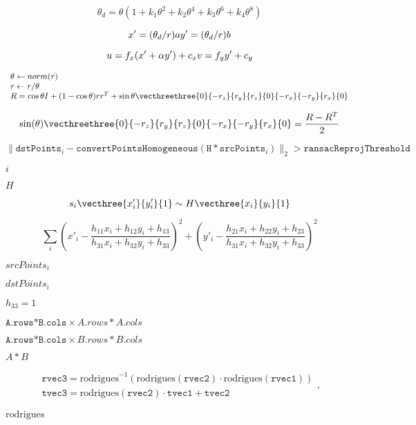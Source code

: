 \documentclass{article}
\begin{document}
\[\theta_d = \theta (1 + k_1 \theta^2 + k_2 \theta^4 + k_3 \theta^6 + k_4 \theta^8)\]
\pagebreak

\[x' = (\theta_d / r) a \\ y' = (\theta_d / r) b \]
\pagebreak

\[u = f_x (x' + \alpha y') + c_x \\ v = f_y y' + c_y\]
\pagebreak

\[\begin{array}{l} \theta \leftarrow norm(r) \\ r \leftarrow r/ \theta \\ R = \cos{\theta} I + (1- \cos{\theta} ) r r^T + \sin{\theta} \vecthreethree{0}{-r_z}{r_y}{r_z}{0}{-r_x}{-r_y}{r_x}{0} \end{array}\]
\pagebreak

\[\sin ( \theta ) \vecthreethree{0}{-r_z}{r_y}{r_z}{0}{-r_x}{-r_y}{r_x}{0} = \frac{R - R^T}{2}\]
\pagebreak

\[\| \texttt{dstPoints} _i - \texttt{convertPointsHomogeneous} ( \texttt{H} * \texttt{srcPoints} _i) \|_2 > \texttt{ransacReprojThreshold}\]
\pagebreak

$i$
\pagebreak

$H$
\pagebreak

\[s_i \vecthree{x'_i}{y'_i}{1} \sim H \vecthree{x_i}{y_i}{1}\]
\pagebreak

\[\sum _i \left ( x'_i- \frac{h_{11} x_i + h_{12} y_i + h_{13}}{h_{31} x_i + h_{32} y_i + h_{33}} \right )^2+ \left ( y'_i- \frac{h_{21} x_i + h_{22} y_i + h_{23}}{h_{31} x_i + h_{32} y_i + h_{33}} \right )^2\]
\pagebreak

$srcPoints_i$
\pagebreak

$dstPoints_i$
\pagebreak

$h_{33}=1$
\pagebreak

$\texttt{A.rows*B.cols} \times {A.rows*A.cols}$
\pagebreak

$\texttt{A.rows*B.cols} \times {B.rows*B.cols}$
\pagebreak

$A*B$
\pagebreak

\[\begin{array}{l} \texttt{rvec3} = \mathrm{rodrigues} ^{-1} \left ( \mathrm{rodrigues} ( \texttt{rvec2} ) \cdot \mathrm{rodrigues} ( \texttt{rvec1} ) \right ) \\ \texttt{tvec3} = \mathrm{rodrigues} ( \texttt{rvec2} ) \cdot \texttt{tvec1} + \texttt{tvec2} \end{array} ,\]
\pagebreak

$\mathrm{rodrigues}$
\pagebreak
\end{document}

